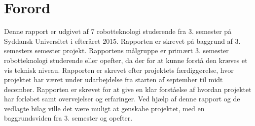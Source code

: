 \section*{Forord}
Denne rapport er udgivet af 7 robotteknologi studerende fra 3. semester på Syddansk Universitet i efteråret 2015. Rapporten er skrevet på baggrund af 3. semesters semester projekt. 
Rapportens målgruppe er primært 3. semester robotteknologi studerende eller opefter, da der for at kunne forstå den kræves et vis teknisk niveau.
Rapporten er skrevet efter projektets færdiggørelse, hvor projektet har været under udarbejdelse fra starten af september til midt december.
Rapporten er skrevet for at give en klar forståelse af hvordan projektet har forløbet samt overvejelser og erfaringer.
Ved hjælp af denne rapport og de vedlagte bilag ville det være muligt at genskabe projektet, med en baggrundsviden fra 3. semester og opefter.